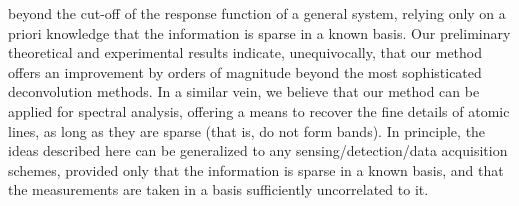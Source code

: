 beyond the cut-off of the response function of a general system,
relying only on a priori knowledge that the information is sparse in a
known basis.  Our preliminary theoretical and experimental results
indicate, unequivocally, that our method offers an improvement by
orders of magnitude beyond the most sophisticated deconvolution
methods. In a similar vein, we believe that our method can be applied
for spectral analysis, offering a means to recover the fine details of
atomic lines, as long as they are sparse (that is, do not form bands). In
principle, the ideas described here can be generalized to any
sensing/detection/data acquisition schemes, provided only that the 
information is sparse in a known basis, and that the measurements are
taken in a basis sufficiently uncorrelated to it.






